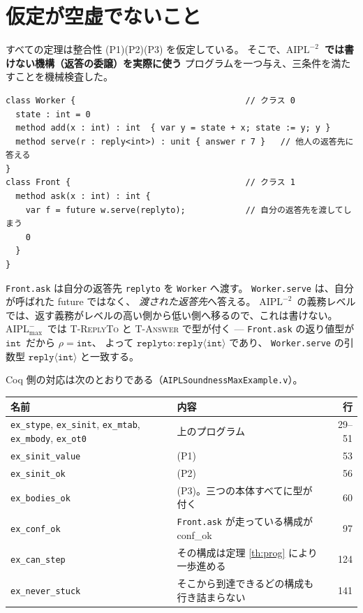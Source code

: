 \documentclass[11pt,a4paper]{ltjsarticle}
\theoremstyle{definition}
\theoremstyle{remark}
\newcommand{\tint}{\ensuremath{\mathtt{int}}}
\newcommand{\trep}[1]{\ensuremath{\mathtt{reply}\langle #1 \rangle}}
\newcommand{\confok}{\textsf{conf\_ok}}
\newcommand{\Amax}{\ensuremath{\mathrm{AIPL}^{-}_{\max}}}
\newcommand{\Atwo}{\ensuremath{\mathrm{AIPL}^{-2}}}
\begin{document}
\section{仮定が空虚でないこと}\label{sec:example}

すべての定理は整合性 (P1)(P2)(P3) を仮定している。
そこで、\textbf{\Atwo\ では書けない機構（返答の委譲）を実際に使う}
プログラムを一つ与え、三条件を満たすことを機械検査した。

\begin{lstlisting}[language=AIPL]
class Worker {                                  // クラス 0
  state : int = 0
  method add(x : int) : int  { var y = state + x; state := y; y }
  method serve(r : reply<int>) : unit { answer r 7 }   // 他人の返答先に答える
}
class Front {                                   // クラス 1
  method ask(x : int) : int {
    var f = future w.serve(replyto);            // 自分の返答先を渡してしまう
    0
  }
}
\end{lstlisting}

\texttt{Front.ask} は自分の返答先 \texttt{replyto} を \texttt{Worker} へ渡す。
\texttt{Worker.serve} は、自分が呼ばれた future ではなく、
\emph{渡された返答先}へ答える。
\Atwo\ の義務レベルでは、返す義務がレベルの高い側から低い側へ移るので、これは書けない。
\Amax\ では \textsc{T-ReplyTo} と \textsc{T-Answer} で型が付く ---
\texttt{Front.ask} の返り値型が \tint\ だから $\rho = \tint$、
よって $\mathtt{replyto} : \trep{\tint}$ であり、
\texttt{Worker.serve} の引数型 \trep{\tint} と一致する。

Coq 側の対応は次のとおりである（\texttt{AIPLSoundnessMaxExample.v}）。

\begin{center}
\begin{tabular}{p{}p{}r}
\toprule
名前 & 内容 & 行 \\
\midrule
\texttt{ex\_stype}, \texttt{ex\_sinit},
  \texttt{ex\_mtab}, \texttt{ex\_mbody}, \texttt{ex\_ot0}
  & 上のプログラム & 29--51 \\
\texttt{ex\_sinit\_value} & (P1) & 53 \\
\texttt{ex\_sinit\_ok} & (P2) & 56 \\
\texttt{ex\_bodies\_ok} & (P3)。三つの本体すべてに型が付く & 60 \\
\texttt{ex\_conf\_ok} & \texttt{Front.ask} が走っている構成が \confok & 97 \\
\texttt{ex\_can\_step} & その構成は定理 \ref{th:prog} により一歩進める & 124 \\
\texttt{ex\_never\_stuck} & そこから到達できるどの構成も行き詰まらない & 141 \\
\bottomrule
\end{tabular}
\end{center}
\end{document}
